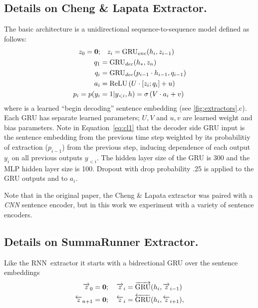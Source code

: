 \subsection{Details on Cheng \& Lapata Extractor.} \label{app:clextractor}
The basic architecture is a unidirectional
sequence-to-sequence
model defined as follows:
\begin{align}
    \encExtHidden_0 = \textbf{0};&\quad   \encExtHidden_i = \gru_{enc}(\sentvec_i, \encExtHidden_{i-1}) \\
    \decExtHidden_1 &= \gru_{dec}(\sentEmb[*], \encExtHidden_{\docSize}) \\
    \decExtHidden_i &= \gru_{dec}(p_{i-1} \cdot \sentvec_{i-1}, \decExtHidden_{i-1}) \label{eq:cl1} \\
   \logits_i &= \relu\left(U \cdot [\encExtHidden_i; \decExtHidden_i] + u \right)\\
    p_i = p(\slabel_i&=1|\slabel_{<i}, \sentvec) = \sigma\left(V\cdot \logits_i + v  \right) 
\end{align}
where \sentEmb[*] is a learned ``begin decoding'' sentence embedding
(see \autoref{fig:extractors}.c).
Each GRU has separate learned 
parameters; $U, V$ and $u, v$ are learned weight and bias parameters.
Note in Equation~\ref{eq:cl1} that 
the decoder side GRU input is the sentence embedding from the previous time
step weighted by its probabilitiy of extraction ($p_{i-1}$) from the 
previous step, inducing dependence of each output $y_i$ on all previous 
outputs $y_{<i}$.
The hidden layer size of the GRU is 300 and the MLP hidden layer
size is 100. 
Dropout with drop probability .25 is applied to the GRU outputs and to $a_i$.



Note that in the original paper, the Cheng \& Lapata extractor was paired 
with
a \textit{CNN} sentence encoder, but in this work we experiment with a variety
of sentence encoders.

\subsection{Details on SummaRunner Extractor.} \label{app:srextractor}
Like the
RNN~extractor it starts with a bidrectional GRU over the sentence 
embeddings 
\begin{align}
    \overrightarrow{z}_0 = \textbf{0}&;\quad \overrightarrow{z}_i = \overrightarrow{\operatorname{GRU}}(h_i, \overrightarrow{z}_{i-1}) \\
    \overleftarrow{z}_{n + 1} = \textbf{0}&;\quad \overleftarrow{z}_i = \overleftarrow{\operatorname{GRU}}(h_i, \overleftarrow{z}_{i+1}),
\end{align}


